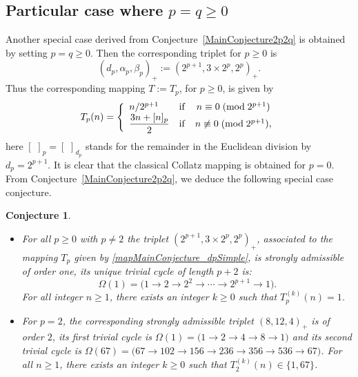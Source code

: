 \documentclass[11pt,a4paper]{article}
\newtheorem{conjecture}{Conjecture}[section]
\newcommand*\modd[3]{#1\equiv#2\;( {\rm mod}\;  #3)}
\newcommand*\notmodd[3]{#1\not\equiv#2\;( {\rm mod}\;  #3)}
\begin{document}
\subsection{Particular case where $p=q\geq 0$}
Another special case derived from Conjecture~\ref{MainConjecture2p2q} is obtained by setting $p=q \geq 0$. Then the corresponding triplet for $p\geq 0$  is
$$(d_p,\alpha_p,\beta_p)_+:=(2^{p+1},3\times 2^p,2^p)_+.$$
Thus the 
corresponding mapping $T:=T_{p}$, for $p\geq 0$, is given  by
\begin{equation}\label{mapMainConjecture_dpSimple}
	T_{p}(n)=\left\{\begin{array}{lcc}
		n/2^{p+1}&\mathrm{if}& \modd{n}{0}{2^{p+1}}\\
		\dfrac{3n+[ n]_{p}}{2}&\mathrm{if}& \notmodd{n}{0}{2^{p+1}},\\
	\end{array}\right.
\end{equation}
here $[\,\,]_{p}=[\,\,]_{d_{p}}$ stands for the remainder in the Euclidean division by $d_{p}=2^{p+1}$.  It is clear that the classical Collatz mapping is obtained for $p=0$.   From Conjecture~\ref{MainConjecture2p2q},  we deduce the following special case conjecture.

\begin{conjecture}\label{MainConjecture2p}
	\begin{itemize}
		\item   For all $p\geq 0$ with $p\not=2$  the triplet  $(2^{p+1},3\times 2^{p},2^{p})_+$, associated to the mapping $T_p$ given by \eqref{mapMainConjecture_dpSimple}, is strongly  admissible  of order one, its unique  trivial cycle of length $p+2$ is:
		$$\Omega(1)=\bigl(1\rightarrow  2\rightarrow 2^2
		\rightarrow\cdots \rightarrow 
		2^{p+1}\rightarrow 1\bigr).$$
		For all integer $n\geq 1$, there exists an integer $k\geq 0$ such that $T^{(k)}_p(n)=1$.\\
		\item For $p=2$, the corresponding strongly admissible triplet $(8,12,4)_+$ is of order  $2$, its first trivial cycle is $\Omega(1)=\bigl(1\rightarrow2\rightarrow4\rightarrow8\rightarrow1\bigr)$  and its second trivial cycle is 
		$\Omega(67)=
		\bigl(67\rightarrow102\rightarrow156\rightarrow236\rightarrow356\rightarrow536\rightarrow67\bigr)$. For all $n\geq 1$, there exists an integer $k\geq 0$ such that $T_2^{(k)}(n)\in\{1,67\}$.
	\end{itemize}
\end{conjecture}
\end{document}
